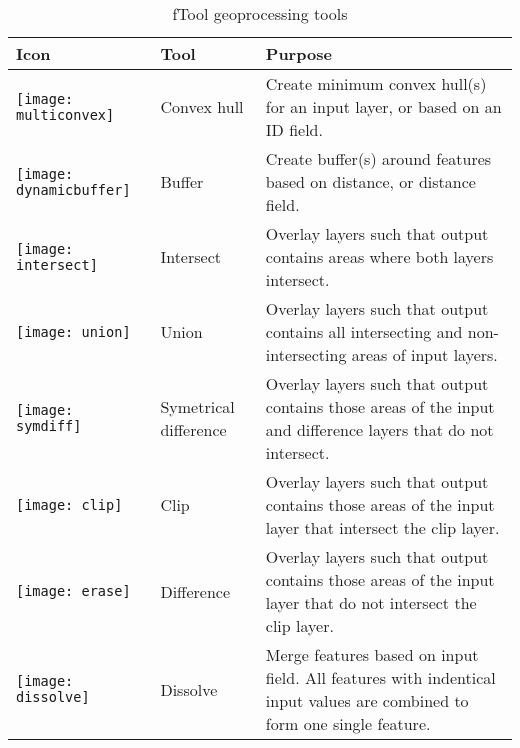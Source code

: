 \begin{table}[ht]
\centering
\caption{fTool geoprocessing tools}\label{tab:ftool_geoprocessing}\medskip
 \begin{tabular}{|p{0.3in}|p{0.8in}|p{5.1in}|}
 \hline \textbf{Icon} & \textbf{Tool} & \textbf{Purpose} \\
 \hline \texttt{[image: multiconvex]} & Convex hull & Create minimum convex hull(s) for an input layer, or based on an ID field. \\
 \hline \texttt{[image: dynamicbuffer]} & Buffer & Create buffer(s) around features based on distance, or distance field. \\
 \hline \texttt{[image: intersect]} & Intersect & Overlay layers such that output contains areas where both layers intersect. \\
 \hline \texttt{[image: union]} & Union & Overlay layers such that output contains all intersecting and non-intersecting areas of input layers. \\
 \hline \texttt{[image: symdiff]} & Symetrical difference & Overlay layers such that output contains those areas of the input and difference layers that do not intersect. \\
 \hline \texttt{[image: clip]} & Clip & Overlay layers such that output contains those areas of the input layer that intersect the clip layer. \\
 \hline \texttt{[image: erase]} & Difference & Overlay layers such that output contains those areas of the input layer that do not intersect the clip layer. \\
 \hline \texttt{[image: dissolve]} & Dissolve & Merge features based on input field. All features with indentical input values are combined to form one single feature. \\
 \hline
\end{tabular}
\end{table}


